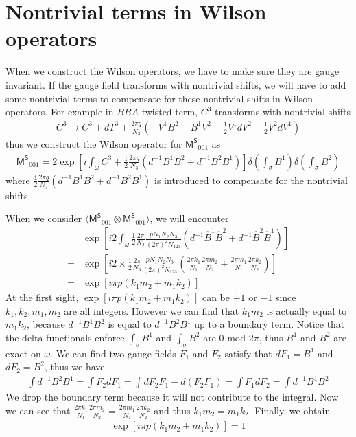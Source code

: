 \documentclass[11pt,nofootinbib,preprint]{revtex4-1}
\begin{document}
\section{Nontrivial terms in Wilson operators\label{ap1}}
When we construct the Wilson operators, we have to make sure they are gauge invariant. If the gauge field transforms with nontrivial shifts, we will have to add some nontrivial terms to compensate for these nontrivial shifts in Wilson operators. For example in $BBA$ twisted term, $C^3$ transforms with nontrivial shifts
\begin{align}
	C^3\rightarrow C^3+dT^3+\frac{2\pi q}{N_3}\left( -V^1B^2-B^1V^2-\frac{1}{2}V^1dV^2-\frac{1}{2}V^2dV^1 \right) 
\end{align}
thus we construct the Wilson operator for $\mathsf{M^S}_{001}$ as 
\begin{align}
	\mathsf{M^S}_{001}=2\exp \left[ i\int_{\omega}{C^3+\frac{1}{2}\frac{2\pi q}{N_3}\left( d^{-1}B^1B^2+d^{-1}B^2B^1 \right)} \right] \delta \left( \int_{\sigma}{B^1} \right) \delta \left( \int_{\sigma}{B^2} \right) 
\end{align}
where $\frac{1}{2}\frac{2\pi q}{N_3}\left( d^{-1}B^1B^2+d^{-1}B^2B^1 \right)$ is introduced to compensate for the nontrivial shifts.

When we consider $\langle \mathsf{M^S}_{001}\otimes \mathsf{M^S}_{001} \rangle $, we will encounter 
\begin{align}
	&\exp \left[ i2\int_{\omega}{\frac{1}{2}\frac{2\pi}{N_3}\frac{pN_1N_2N_3}{\left( 2\pi \right) ^2N_{123}}\left( d^{-1}\hat{B}^1\hat{B}^2+d^{-1}\hat{B}^2\hat{B}^1 \right)} \right] \nonumber
	\\
	=&\exp \left[ i2\times\frac{1}{2}\frac{2\pi}{N_3}\frac{pN_1N_2N_3}{\left( 2\pi \right) ^2N_{123}}\left( \frac{2\pi k_1}{N_1}\frac{2\pi m_2}{N_2}+\frac{2\pi m_1}{N_1}\frac{2\pi k_2}{N_2} \right) \right] \nonumber
	\\
	=&\exp \left[ i\pi p\left( k_1m_2+m_1k_2 \right) \right] 
\end{align}
At the first sight, $\exp \left[ i\pi p\left( k_1m_2+m_1k_2 \right) \right]$ can be $+1$ or $-1$ since $k_1,k_2,m_1,m_2$ are all integers. However we can find that $k_1m_2$ is actually equal to $m_1k_2$, because $d^{-1}B^1B^2$ is equal to $d^{-1}B^2B^1$ up to a boundary term. Notice that the delta functionals enforce $\int_{\sigma}{B^1}$ and $\int_{\sigma}{B^2}$ are $0$ mod $2\pi$, thus $B^1$ and $B^2$ are exact on $\omega$. We can find two gauge fields $F_1$ and $F_2$ satisfy that $dF_1=B^1$ and $dF_2=B^2$, thus we have
\begin{align}
	\int{d^{-1}B^2B^1}=\int{F_2dF_1}=\int{dF_2F_1-d\left( F_2F_1 \right)}=\int{F_1dF_2}=\int{d^{-1}B^1B^2}
\end{align}
We drop the boundary term because it will not contribute to the integral. Now we can see that $\frac{2\pi k_1}{N_1}\frac{2\pi m_2}{N_2}=\frac{2\pi m_1}{N_1}\frac{2\pi k_2}{N_2}$ and thus $k_1m_2=m_1k_2$. Finally, we obtain 
\begin{align}
	\exp \left[ i\pi p\left( k_1m_2+m_1k_2 \right) \right] =1
\end{align}
\end{document}
